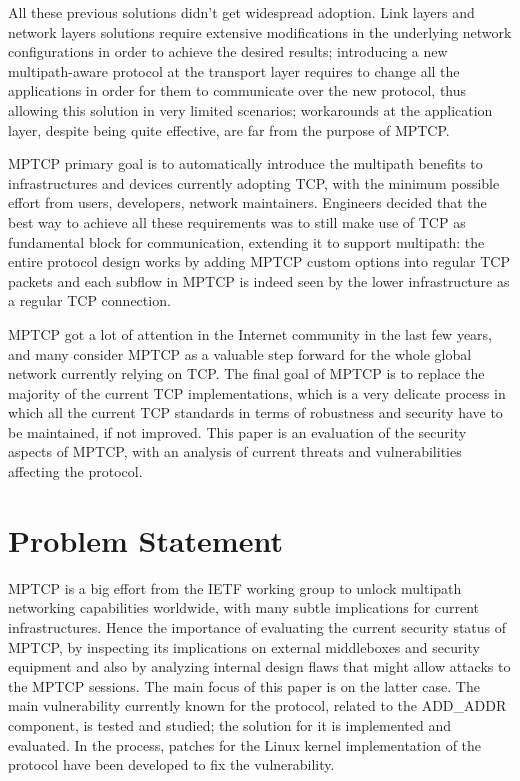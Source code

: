 \vspace{5mm}
All these previous solutions didn't get widespread adoption. Link layers and network layers solutions require extensive modifications in the underlying network configurations in order to achieve the desired results; introducing a new multipath-aware protocol at the transport layer requires to change all the applications in order for them to communicate over the new protocol, thus allowing this solution in very limited scenarios; workarounds at the application layer, despite being quite effective, are far from the purpose of MPTCP.


MPTCP primary goal is to automatically introduce the multipath benefits to infrastructures and devices currently adopting TCP, with the minimum possible effort from users, developers, network maintainers. Engineers decided that the best way to achieve all these requirements was to still make use of TCP as fundamental block for communication, extending it to support multipath: the entire protocol design works by adding MPTCP custom options into regular TCP packets and each subflow in MPTCP is indeed seen by the lower infrastructure as a regular TCP connection. 

\vspace{5mm}
MPTCP got a lot of attention in the Internet community in the last few years, and many consider MPTCP as a valuable step forward for the whole global network currently relying on TCP.
The final goal of MPTCP is to replace the majority of the current TCP implementations, which is a very delicate process in which all the current TCP standards in terms of robustness and security have to be maintained, if not improved. This paper is an evaluation of the security aspects of MPTCP, with an analysis of current threats and vulnerabilities affecting the protocol.

\section{Problem Statement}
MPTCP is a big effort from the IETF working group to unlock multipath networking capabilities worldwide, with many subtle implications for current infrastructures. Hence the importance of evaluating the current security status of MPTCP, by inspecting its implications on external middleboxes and security equipment and also by analyzing internal design flaws that might allow attacks to the MPTCP sessions. The main focus of this paper is on the latter case. The main vulnerability currently known for the protocol, related to the ADD\_ADDR component, is tested and studied; the solution for it is implemented and evaluated. In the process, patches for the Linux kernel implementation of the protocol have been developed to fix the vulnerability. 


